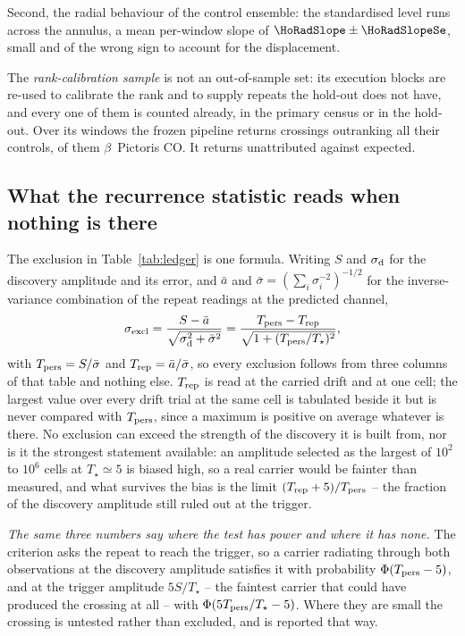 Second, the radial behaviour of the control ensemble: the standardised level
runs \HoRadBins{} across the annulus, a mean per-window slope of
$\HoRadSlope\pm\HoRadSlopeSe$, small and of the wrong sign to account for the
displacement.

The \emph{rank-calibration sample} is not an out-of-sample set: its
\CampBlocks{} execution blocks are re-used to calibrate the rank and to supply
repeats the hold-out does not have, and every one of them is counted already,
in the primary census or in the hold-out. Over its \CampWindows{}
windows the frozen pipeline returns \CampStageOne{} crossings outranking all
their controls, \CampStageOneCO{} of them $\beta$~Pictoris CO. It returns
\CampUnattrib{} unattributed against \CampExpUn{} expected.

\subsection{What the recurrence statistic reads when nothing is there}

The exclusion in Table~\ref{tab:ledger} is one formula. Writing $S$ and
$\sigma_{\rm d}$ for the discovery amplitude and its error, and $\bar{a}$ and
$\bar{\sigma}=(\sum_i\sigma_i^{-2})^{-1/2}$ for the inverse-variance
combination of the repeat readings at the predicted channel,
\begin{equation}
\sigma_{\rm excl}=\frac{S-\bar{a}}
{\sqrt{\sigma_{\rm d}^{2}+\bar{\sigma}^{2}}}
=\frac{T_{\rm pers}-T_{\rm rep}}{\sqrt{1+(T_{\rm pers}/T_\star)^{2}}},
\label{eq:excl}
\end{equation}
with $T_{\rm pers}=S/\bar{\sigma}$ and $T_{\rm rep}=\bar{a}/\bar{\sigma}$, so
every exclusion follows from three columns of that table and nothing else.
$T_{\rm rep}$ is read at the carried drift and at one cell; the largest value
over every drift trial at the same cell is tabulated beside it but is never
compared with $T_{\rm pers}$, since a maximum is positive on average whatever
is there. No exclusion can exceed the strength of the discovery it is built
from, nor is it the strongest statement available: an amplitude selected as
the largest of $10^{2}$ to $10^{6}$ cells at $T_\star\simeq5$ is biased high,
so a real carrier would be fainter than measured, and what survives the bias
is the limit $(T_{\rm rep}+5)/T_{\rm pers}$ -- the fraction of the discovery
amplitude still ruled out at the trigger.

\emph{The same three numbers say where the test has power and where it has
none.} The criterion asks the repeat to reach the trigger, so a carrier
radiating through both observations at the discovery amplitude satisfies it
with probability $\Phi(T_{\rm pers}-5)$, and at the trigger amplitude
$5S/T_\star$ -- the faintest carrier that could have produced the crossing
at all -- with $\Phi(5T_{\rm pers}/T_\star-5)$. Where they are small the
crossing is untested rather than excluded, and is reported that way.

